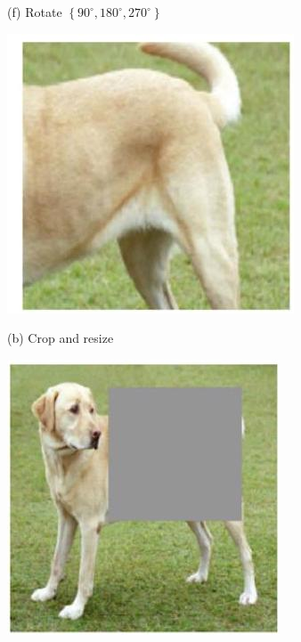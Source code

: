 \documentclass[10pt]{article}
\begin{document}
(f) Rotate $\left\{90^{\circ}, 180^{\circ}, 270^{\circ}\right\}$

\begin{center}
\includegraphics[max width=\textwidth]{2024_01_08_7c14f4867d7823fc5a52g-14(4)}
\end{center}

(b) Crop and resize

\begin{center}
\includegraphics[max width=\textwidth]{2024_01_08_7c14f4867d7823fc5a52g-14(9)}
\end{center}
\end{document}

